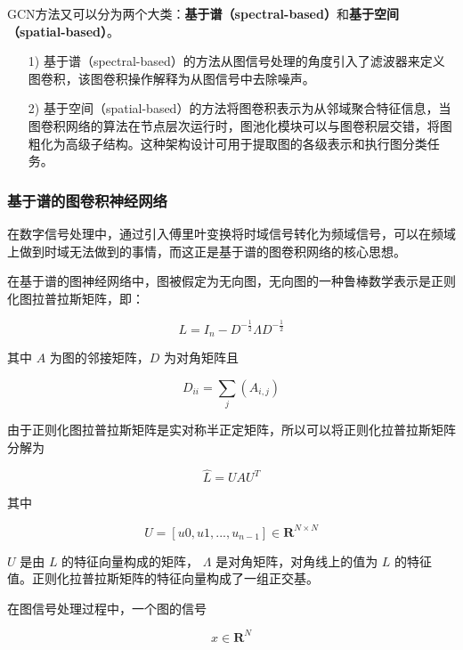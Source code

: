 \documentclass[UTF8]{ctexart}
\begin{document}
GCN方法又可以分为两个大类：\textbf{基于谱（spectral-based）}和\textbf{基于空间（spatial-based）}。

\begin{itemize}
\item [1)] 
基于谱（spectral-based）的方法从图信号处理的角度引入了滤波器来定义图卷积，该图卷积操作解释为从图信号中去除噪声。
\item [2)]
基于空间（spatial-based）的方法将图卷积表示为从邻域聚合特征信息，当图卷积网络的算法在节点层次运行时，图池化模块可以与图卷积层交错，将图粗化为高级子结构。这种架构设计可用于提取图的各级表示和执行图分类任务。
\end{itemize}

\subsubsection{基于谱的图卷积神经网络}

在数字信号处理中，通过引入傅里叶变换将时域信号转化为频域信号，可以在频域上做到时域无法做到的事情，而这正是基于谱的图卷积网络的核心思想。

在基于谱的图神经网络中，图被假定为无向图，无向图的一种鲁棒数学表示是正则化图拉普拉斯矩阵，即：

\begin{equation} 
L=I_n-D^{-\frac{1}{2}} \Lambda D^{-\frac{1}{2}}
\end{equation}

其中 $A$ 为图的邻接矩阵，$D$ 为对角矩阵且

\begin{equation} 
D_{ii}=\sum_j(A_{i,j})
\end{equation}

由于正则化图拉普拉斯矩阵是实对称半正定矩阵，所以可以将正则化拉普拉斯矩阵分解为

\begin{equation} 
\widehat{L}=UAU^T
\end{equation}

其中

\begin{equation} 
U=[u0,u1,...,u_{n-1}] \in \mathbf{R}^{N \times N}
\end{equation}

$U$ 是由 $L$ 的特征向量构成的矩阵， $\Lambda$ 是对角矩阵，对角线上的值为 $L$ 的特征值。正则化拉普拉斯矩阵的特征向量构成了一组正交基。 \par

在图信号处理过程中，一个图的信号

\begin{equation} 
x \in \mathbf{R}^{N}
\end{equation}
\end{document}
